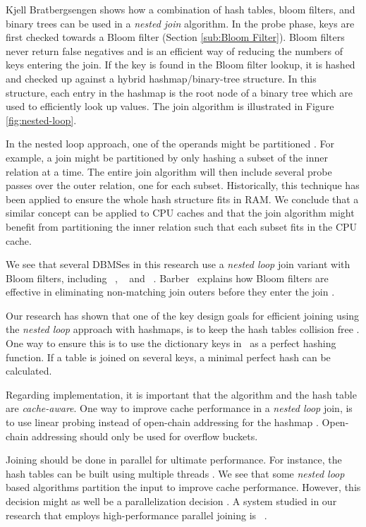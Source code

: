 
Kjell Bratbergsengen shows how a combination of hash tables, bloom filters, and binary trees can be used in a \textit{nested join} algorithm. In the probe phase, keys are first checked towards a Bloom filter (Section \ref{sub:Bloom Filter}). Bloom filters never return false negatives and is an efficient way of reducing the numbers of keys entering the join. If the key is found in the Bloom filter lookup, it is hashed and checked up against a hybrid hashmap/binary-tree structure. In this structure, each entry in the hashmap is the root node of a binary tree which are used to efficiently look up values. The join algorithm is illustrated in Figure \ref{fig:nested-loop}.

In the nested loop approach, one of the operands might be partitioned \cite{Bratbergsengen2015-ed}. For example, a join might be partitioned by only hashing a subset of the inner relation at a time. The entire join algorithm will then include several probe passes over the outer relation, one for each subset. Historically, this technique has been applied to ensure the whole hash structure fits in RAM. We conclude that a similar concept can be applied to CPU caches and that the join algorithm might benefit from partitioning the inner relation such that each subset fits in the CPU cache.

We see that several DBMSes in this research use a \textit{nested loop} join variant with Bloom filters, including \oracle~\cite{Lahiri2015-mz}, \ibm~\cite{Raman2013-em} and \blink~\cite{Raman2008-gi}. Barber \ea~explains how Bloom filters are effective in eliminating non-matching join outers before they enter the join \cite{Barber2014-ey}.

Our research has shown that one of the key design goals for efficient joining using the \textit{nested loop} approach with hashmaps, is to keep the hash tables collision free \cite{Raman2008-gi, Raman2013-em}. One way to ensure this is to use the dictionary keys in \de~as a perfect hashing function. If a table is joined on several keys, a minimal perfect hash can be calculated.

Regarding implementation, it is important that the algorithm and the hash table are \textit{cache-aware}. One way to improve cache performance in a \textit{nested loop} join, is to use linear probing instead of open-chain addressing for the hashmap \cite{Raman2008-gi}. Open-chain addressing should only be used for overflow buckets.

Joining should be done in parallel for ultimate performance. For instance, the hash tables can be built using multiple threads \cite{Barber2014-ey}. We see that some \textit{nested loop} based algorithms partition the input to improve cache performance. However, this decision might as well be a parallelization decision \cite{Neumann2011-uq}. A system studied in our research that employs high-performance parallel joining is \ibm~\cite{Raman2013-em}.
